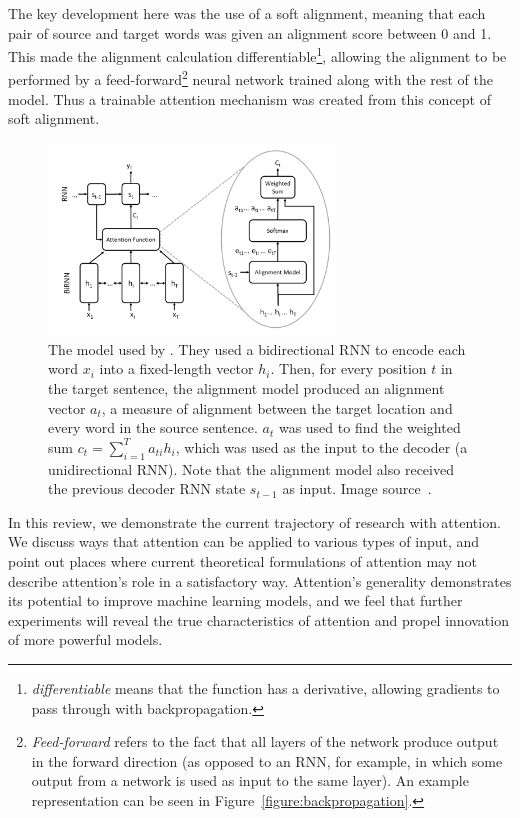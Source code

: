 \documentclass{article}
\begin{document}
The key development here was the use of a soft alignment, meaning that each pair of source and target words was given an alignment score between 0 and 1. This made the alignment calculation differentiable\footnote{\textit{differentiable} means that the function has a derivative, allowing gradients to pass through with backpropagation.}, allowing the alignment to be performed by a feed-forward\footnote{\textit{Feed-forward} refers to the fact that all layers of the network produce output in the forward direction (as opposed to an RNN, for example, in which some output from a network is used as input to the same layer). An example representation can be seen in Figure~\ref{figure:backpropagation}.} neural network trained along with the rest of the model. Thus a trainable attention mechanism was created from this concept of soft alignment.

\begin{figure}
    \centering
    \includegraphics[width=3in]{figures/rnn_search.png}
    \caption{The model used by \protect\cite{joint_align_translate}. They used a bidirectional RNN to encode each word $x_i$ into a fixed-length vector $h_i$. Then, for every position $t$ in the target sentence, the alignment model produced an alignment vector $a_t$, a measure of alignment between the target location and every word in the source sentence. $a_t$ was used to find the weighted sum $c_t=\sum_{i=1}^Ta_{ti}h_i$, which was used as the input to the decoder (a unidirectional RNN). Note that the alignment model also received the previous decoder RNN state $s_{t-1}$ as input. Image source~\protect\cite{attention_please}.}\label{figure:rnn_search}
\end{figure}

In this review, we demonstrate the current trajectory of research with attention. We discuss ways that attention can be applied to various types of input, and point out places where current theoretical formulations of attention may not describe attention's role in a satisfactory way. Attention's generality demonstrates its potential to improve machine learning models, and we feel that further experiments will reveal the true characteristics of attention and propel innovation of more powerful models.
\end{document}
